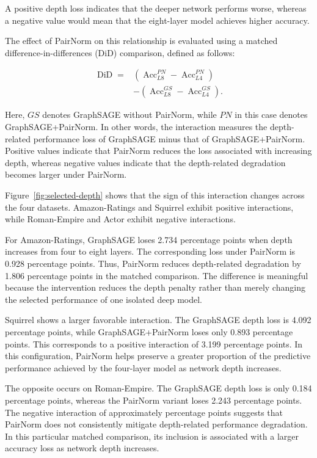 \documentclass[english]{lni}
\begin{document}
A positive depth loss indicates that the deeper network performs worse, whereas a negative value would mean that the eight-layer model achieves higher accuracy.

The effect of PairNorm on this relationship is evaluated using a matched difference-in-differences (DiD) comparison, defined as follows:

\begin{equation}
\begin{split}
\operatorname{DiD}
={}&
(\operatorname{Acc}^{PN}_{L8}
-\operatorname{Acc}^{PN}_{L4})\\
&-
(\operatorname{Acc}^{GS}_{L8}
-\operatorname{Acc}^{GS}_{L4}).
\end{split}
\label{eq:depth-did}
\end{equation}

Here, $GS$ denotes GraphSAGE without PairNorm, while $PN$ in this case denotes GraphSAGE+PairNorm. In other words, the interaction measures the depth-related performance loss of GraphSAGE minus that of GraphSAGE+PairNorm. Positive values indicate that PairNorm reduces the loss associated with increasing depth, whereas negative values indicate that the depth-related degradation becomes larger under PairNorm.

Figure~\ref{fig:selected-depth} shows that the sign of this interaction changes across the four datasets. Amazon-Ratings and Squirrel exhibit positive interactions, while Roman-Empire and Actor exhibit negative interactions.

For Amazon-Ratings, GraphSAGE loses 2.734 percentage points when depth increases from four to eight layers. The corresponding loss under PairNorm is 0.928 percentage points. Thus, PairNorm reduces depth-related degradation by 1.806 percentage points in the matched comparison. The difference is meaningful because the intervention reduces the depth penalty rather than merely changing the selected performance of one isolated deep model.

Squirrel shows a larger favorable interaction. The GraphSAGE depth loss is 4.092 percentage points, while GraphSAGE+PairNorm loses only 0.893 percentage points. This corresponds to a positive interaction of 3.199 percentage points. In this configuration, PairNorm helps preserve a greater proportion of the predictive performance achieved by the four-layer model as network depth increases.

The opposite occurs on Roman-Empire. The GraphSAGE depth loss is only 0.184 percentage points, whereas the PairNorm variant loses 2.243 percentage points. The negative interaction of approximately \mbox{} percentage points suggests that PairNorm does not consistently mitigate depth-related performance degradation. In this particular matched comparison, its inclusion is associated with a larger accuracy loss as network depth increases.
\end{document}
